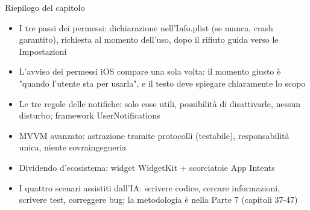 \begin{tcbsummary}{Riepilogo del capitolo}
\begin{itemize}
  \item I tre passi dei permessi: dichiarazione nell'Info.plist (se manca, crash garantito), richiesta al momento dell'uso, dopo il rifiuto guida verso le Impostazioni
  \item L'avviso dei permessi iOS compare una sola volta: il momento giusto è "quando l'utente sta per usarla", e il testo deve spiegare chiaramente lo scopo
  \item Le tre regole delle notifiche: solo cose utili, possibilità di disattivarle, nessun disturbo; framework UserNotifications
  \item MVVM avanzato: astrazione tramite protocolli (testabile), responsabilità unica, niente sovraingegneria
  \item Dividendo d'ecosistema: widget WidgetKit + scorciatoie App Intents
  \item I quattro scenari assistiti dall'IA: scrivere codice, cercare informazioni, scrivere test, correggere bug; la metodologia è nella Parte 7 (capitoli 37-47)
\end{itemize}

\end{tcbsummary}
